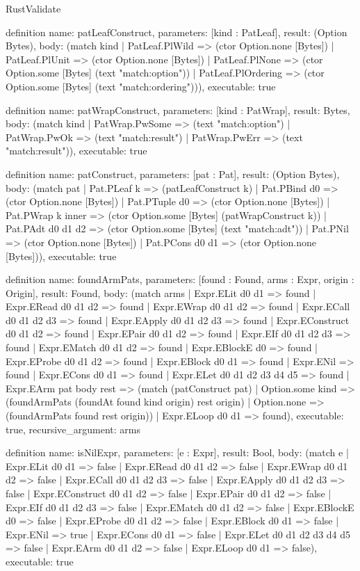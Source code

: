 \begin{lexlean}{RustValidate}
\begin{semanticmodule}
definition{
  name: patLeafConstruct,
  parameters: [kind : PatLeaf],
  result: (Option Bytes),
  body: (match kind
    | PatLeaf.PlWild => (ctor Option.none [Bytes])
    | PatLeaf.PlUnit => (ctor Option.none [Bytes])
    | PatLeaf.PlNone => (ctor Option.some [Bytes] (text "match:option"))
    | PatLeaf.PlOrdering => (ctor Option.some [Bytes] (text "match:ordering"))),
  executable: true
}

definition{
  name: patWrapConstruct,
  parameters: [kind : PatWrap],
  result: Bytes,
  body: (match kind
    | PatWrap.PwSome => (text "match:option")
    | PatWrap.PwOk => (text "match:result")
    | PatWrap.PwErr => (text "match:result")),
  executable: true
}

definition{
  name: patConstruct,
  parameters: [pat : Pat],
  result: (Option Bytes),
  body: (match pat
    | Pat.PLeaf k => (patLeafConstruct k)
    | Pat.PBind d0 => (ctor Option.none [Bytes])
    | Pat.PTuple d0 => (ctor Option.none [Bytes])
    | Pat.PWrap k inner => (ctor Option.some [Bytes] (patWrapConstruct k))
    | Pat.PAdt d0 d1 d2 => (ctor Option.some [Bytes] (text "match:adt"))
    | Pat.PNil => (ctor Option.none [Bytes])
    | Pat.PCons d0 d1 => (ctor Option.none [Bytes])),
  executable: true
}

definition{
  name: foundArmPats,
  parameters: [found : Found, arms : Expr, origin : Origin],
  result: Found,
  body: (match arms
    | Expr.ELit d0 d1 => found
    | Expr.ERead d0 d1 d2 => found
    | Expr.EWrap d0 d1 d2 => found
    | Expr.ECall d0 d1 d2 d3 => found
    | Expr.EApply d0 d1 d2 d3 => found
    | Expr.EConstruct d0 d1 d2 => found
    | Expr.EPair d0 d1 d2 => found
    | Expr.EIf d0 d1 d2 d3 => found
    | Expr.EMatch d0 d1 d2 => found
    | Expr.EBlockE d0 => found
    | Expr.EProbe d0 d1 d2 => found
    | Expr.EBlock d0 d1 => found
    | Expr.ENil => found
    | Expr.ECons d0 d1 => found
    | Expr.ELet d0 d1 d2 d3 d4 d5 => found
    | Expr.EArm pat body rest => (match (patConstruct pat)
      | Option.some kind => (foundArmPats (foundAt found kind origin) rest origin)
      | Option.none => (foundArmPats found rest origin))
    | Expr.ELoop d0 d1 => found),
  executable: true,
  recursive_argument: arms
}

definition{
  name: isNilExpr,
  parameters: [e : Expr],
  result: Bool,
  body: (match e
    | Expr.ELit d0 d1 => false
    | Expr.ERead d0 d1 d2 => false
    | Expr.EWrap d0 d1 d2 => false
    | Expr.ECall d0 d1 d2 d3 => false
    | Expr.EApply d0 d1 d2 d3 => false
    | Expr.EConstruct d0 d1 d2 => false
    | Expr.EPair d0 d1 d2 => false
    | Expr.EIf d0 d1 d2 d3 => false
    | Expr.EMatch d0 d1 d2 => false
    | Expr.EBlockE d0 => false
    | Expr.EProbe d0 d1 d2 => false
    | Expr.EBlock d0 d1 => false
    | Expr.ENil => true
    | Expr.ECons d0 d1 => false
    | Expr.ELet d0 d1 d2 d3 d4 d5 => false
    | Expr.EArm d0 d1 d2 => false
    | Expr.ELoop d0 d1 => false),
  executable: true
}


\end{semanticmodule}
\end{lexlean}
